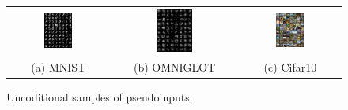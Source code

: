 \begin{figure}[!htbp]
    \centering
    \begin{tabular}{ccc}
    \includegraphics[width=0.3\textwidth]{pics/5_dvp/mnist_ctx_samples.pdf} &  
        \includegraphics[width=0.3\textwidth]{pics/5_dvp/omniglot_ctx_samples.pdf} & 
        \includegraphics[width=0.3\textwidth]{pics/5_dvp/cifar10_ctx_samples.pdf}\\
        (a) MNIST  & (b) OMNIGLOT & (c) Cifar10\\
    \end{tabular}
    \caption{Uncoditional samples of pseudoinputs.}
    \vskip -10pt
    \label{fig:ctx_samples}
\end{figure}


